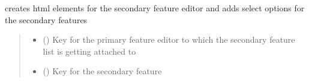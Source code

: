 \documentclass[letterpaper,10pt,english]{sphinxmanual}
\begin{document}
\begin{fulllineitems}
\label{\detokenize{docs_gui/js_api/urbs_editor/generate_urbs_setup_editor:populateUrbsNetworkEditorSecondaryFeature}}
\pysigstartsignatures
{}
\pysigstopsignatures
\sphinxAtStartPar
creates html elements for the secondary feature editor and adds select options for the secondary features
\begin{quote}\begin{description}
\begin{itemize}
\item {} 
\sphinxAtStartPar
{} () \textendash{} Key for the primary feature editor to which the secondary feature list is getting attached to

\item {} 
\sphinxAtStartPar
{} () \textendash{} Key for the secondary feature

\end{itemize}

\end{description}\end{quote}

\end{fulllineitems}

\end{document}
